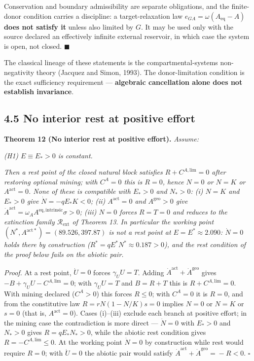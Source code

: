 \documentclass[11pt]{article}
\begin{document}
Conservation and boundary admissibility are separate obligations, and the finite-donor condition carries a discipline: a target-relaxation law \(e_{GA}=\allowbreak{}\omega(A_{\mathrm{eq}}-A)\) \textbf{does not satisfy it} unless also limited by \(G\). It may be used only with the source declared an effectively infinite external reservoir, in which case the system is open, not closed. \(\blacksquare\)

The classical lineage of these statements is the compartmental-systems non-negativity theory (Jacquez and Simon, 1993). The donor-limitation condition is the exact sufficiency requirement --- \textbf{algebraic cancellation alone does not establish invariance}.

\subsection*{4.5 No interior rest at positive effort}\label{45-no-interior-rest-at-positive-effort}

\textbf{Theorem 12 (No interior rest at positive effort).} \emph{Assume:}

\emph{(H1) \(E \equiv E_* > 0\) is constant.}

\emph{Then a rest point of the closed natural block satisfies \(R + C^{A,\mathrm{lim}} = 0\) after restoring optional mining; with \(C^A = 0\) this is \(R = 0\), hence \(N = 0\) or \(N = K\) or \(A^{\mathrm{act}} = 0\). None of these is compatible with \(E_* > 0\) and \(N_* > 0\): (i) \(N = K\) and \(E_* > 0\) give \(\dot N = -qE_* K < 0\); (ii) \(A^{\mathrm{act}} = 0\) and \(A^{\mathrm{geo}} > 0\) give \(\dot A^{\mathrm{act}} =\allowbreak{} \omega_A A^{\mathrm{eq,\allowbreak{}intrinsic}} \sigma > 0\); (iii) \(N = 0\) forces \(R = T = 0\) and reduces to the extinction family \(\mathcal{R}_{\mathrm{ext}}\) of Theorem 13. In particular the working point \((N^*,\allowbreak{} A^{\mathrm{act}*}) =\allowbreak{} (89.526,\allowbreak{} 397.87)\) is not a rest point at \(E = E^* \approx 2.090\): \(\dot N = 0\) holds there by construction (\(R^* =\allowbreak{} qE^*N^* \approx 0.187 > 0\)), and the rest condition of the proof below fails on the abiotic pair.}

\emph{Proof.} At a rest point, \(\dot U = 0\) forces \(\gamma_U U = T\). Adding \(\dot A^{\mathrm{act}} +\allowbreak{} \dot A^{\mathrm{geo}}\) gives \(-B +\allowbreak{} \gamma_U U - C^{A,\allowbreak{}\mathrm{lim}} =\allowbreak{} 0\); with \(\gamma_U U = T\) and \(B = R + T\) this is \(R + C^{A,\mathrm{lim}} = 0\). With mining declared (\(C^A > 0\)) this forces \(R \le 0\); with \(C^A = 0\) it is \(R = 0\), and from the constitutive law \(R =\allowbreak{} rN(1 - N/\allowbreak{}K)s =\allowbreak{} 0\) implies \(N = 0\) or \(N = K\) or \(s = 0\) (that is, \(A^{\mathrm{act}} = 0\)). Cases (i)--(iii) exclude each branch at positive effort; in the mining case the contradiction is more direct --- \(\dot N = 0\) with \(E_* > 0\) and \(N_* > 0\) gives \(R = qE_*N_* > 0\), while the abiotic rest condition gives \(R = -C^{A,\mathrm{lim}} \le 0\). At the working point \(\dot N = 0\) by construction while rest would require \(R = 0\); with \(\dot U = 0\) the abiotic pair would satisfy \(\dot A^{\mathrm{act}} +\allowbreak{} \dot A^{\mathrm{geo}} =\allowbreak{} -R < 0\). \(\square\)
\end{document}
